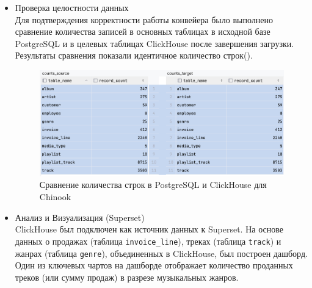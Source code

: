 \begin{enumerate}[1.]
\begin{itemize}
          \item Проверка целостности данных \\
                Для подтверждения корректности работы конвейера было выполнено сравнение количества записей в основных таблицах в исходной базе PostgreSQL и в целевых таблицах ClickHouse после завершения загрузки. Результаты сравнения показали идентичное количество строк().
                \begin{figure}[h]
                  \center
                  \includegraphics [scale=0.5] {my_folder/images/ex2_counts_comparering}
                  \caption{Сравнение количества строк в PostgreSQL и ClickHouse для Chinook}
                  \label{fig:ex2_counts_comparering}
                \end{figure}
                \FloatBarrier
          \item Анализ и Визуализация (Superset) \\
                ClickHouse был подключен как источник данных к Superset. На основе данных о продажах (таблица \texttt{invoice\_line}), треках (таблица \texttt{track}) и жанрах (таблица \texttt{genre}), объединенных в ClickHouse, был построен дашборд. Один из ключевых чартов на дашборде отображает количество проданных треков (или сумму продаж) в разрезе музыкальных жанров.
                \begin{figure}[h]
                  \center

\end{figure}
\end{itemize}
\end{enumerate}

